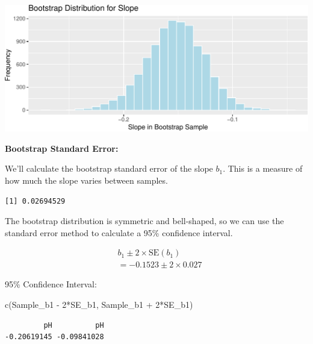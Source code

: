 \documentclass[
  letterpaper,
  DIV=11,
  numbers=noendperiod]{scrreprt}
\newenvironment{Shaded}{\begin{snugshade}}{\end{snugshade}}
\newcommand{\DecValTok}[1]{\textcolor[rgb]{0.68,0.00,0.00}{#1}}
\newcommand{\FunctionTok}[1]{\textcolor[rgb]{0.28,0.35,0.67}{#1}}
\newcommand{\NormalTok}[1]{\textcolor[rgb]{0.00,0.23,0.31}{#1}}
\newcommand{\OtherTok}[1]{\textcolor[rgb]{0.00,0.23,0.31}{#1}}
\newcommand{\SpecialCharTok}[1]{\textcolor[rgb]{0.37,0.37,0.37}{#1}}
\begin{document}
\includegraphics{Ch3_files/figure-pdf/unnamed-chunk-124-1.pdf}

\textbf{Bootstrap Standard Error:}

We'll calculate the bootstrap standard error of the slope \(b_1\). This
is a measure of how much the slope varies between samples.

\begin{Shaded}
\end{Shaded}

\begin{verbatim}
[1] 0.02694529
\end{verbatim}

The bootstrap distribution is symmetric and bell-shaped, so we can use
the standard error method to calculate a 95\% confidence interval.

\[
\begin{aligned}
& b_1 \pm 2\times\text{SE}(b_1) \\
& = -0.1523 \pm 2\times{0.027}
\end{aligned}
\]

95\% Confidence Interval:

\begin{Shaded}
\begin{Highlighting}[]
\FunctionTok{c}\NormalTok{(Sample\_b1 }\SpecialCharTok{{-}} \DecValTok{2}\SpecialCharTok{*}\NormalTok{SE\_b1, Sample\_b1 }\SpecialCharTok{+} \DecValTok{2}\SpecialCharTok{*}\NormalTok{SE\_b1) }
\end{Highlighting}
\end{Shaded}

\begin{verbatim}
         pH          pH 
-0.20619145 -0.09841028 
\end{verbatim}
\end{document}

